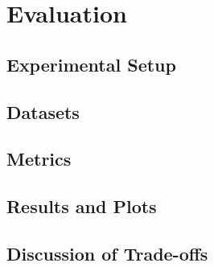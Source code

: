 \section{Evaluation}
\subsection{Experimental Setup}

\subsection{Datasets}

\subsection{Metrics}

\subsection{Results and Plots}

\subsection{Discussion of Trade-offs}
